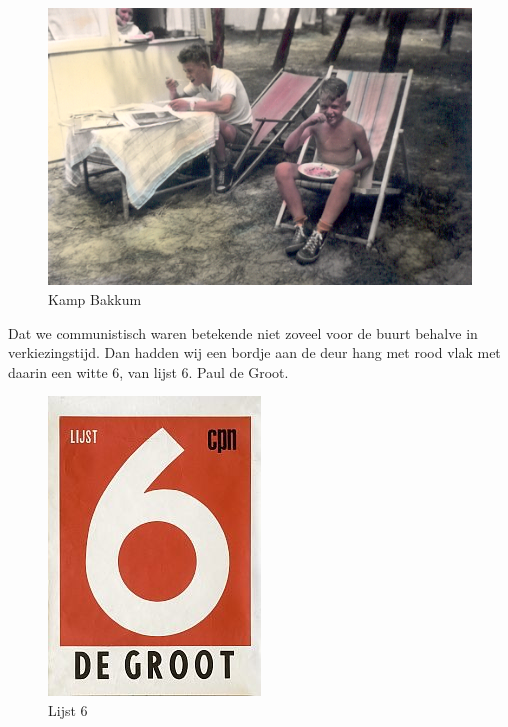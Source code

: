 \documentclass[12pt,twoside, openright]{memoir}
\begin{document}
\begin{figure}
\includegraphics[width=\textwidth]{img/ch5/Bakkum2}
\caption*{\footnotesize Kamp Bakkum}
\end{figure} 

Dat we communistisch waren betekende niet zoveel voor de buurt behalve in verkiezingstijd. Dan hadden wij een bordje aan de deur hang met rood vlak met daarin een witte 6, van lijst 6. Paul de Groot. 

\begin{figure}
\includegraphics[width=\textwidth]{img/ch5/cpn}
\caption*{\footnotesize Lijst 6}
\end{figure} 
\end{document}
